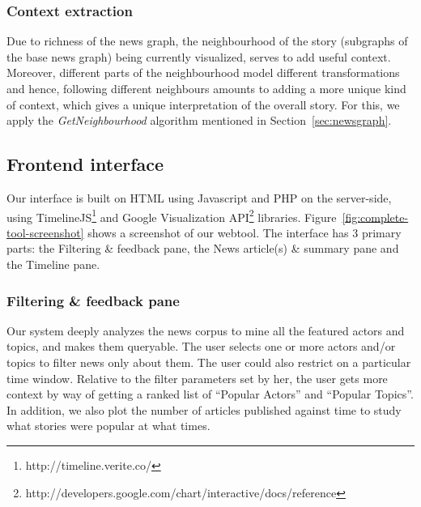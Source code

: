 \subsubsection*{Context extraction}
Due to richness of the news graph, the neighbourhood of the story (subgraphs of the base news graph) being currently visualized, serves to add
useful context. Moreover, different parts of the neighbourhood model different transformations and hence, following
different neighbours amounts to adding a more unique kind of context, which gives a unique interpretation of the overall story. 
For this, we apply the \emph{GetNeighbourhood} algorithm mentioned in Section~\ref{sec:newsgraph}.
\subsection {Frontend interface}
Our interface is built on HTML using Javascript and PHP on the server-side, using TimelineJS\footnote{http://timeline.verite.co/} and Google Visualization API\footnote{http://developers.google.com/chart/interactive/docs/reference} libraries.
Figure~\ref{fig:complete-tool-screenshot} shows a screenshot of our webtool. The interface
has 3 primary parts: the Filtering \& feedback pane, the News article(s) \& summary pane and the Timeline pane. 
\subsubsection*{Filtering \& feedback pane}
Our system deeply analyzes the news corpus to mine all the featured actors and topics, and makes them queryable. The user selects one or more actors
and/or topics to filter news only about them. The user could also restrict on a particular time window. Relative to the filter parameters set by her, 
the user gets more context by way of getting a ranked list of ``Popular Actors'' and ``Popular Topics''. In addition, we also plot the number of
articles published against time to study what stories were popular at what times. 
